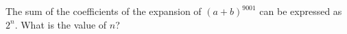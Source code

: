 The sum of the coefficients of the expansion of $(a+b)^{9001}$ can be expressed as $2^n$. What is the value of $n$?
